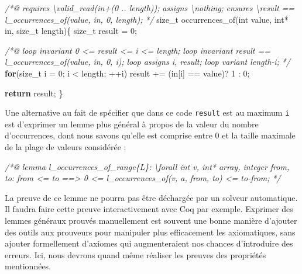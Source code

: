 \documentclass[12pt,francais,]{scrbook}
\newenvironment{Shaded}{}{}
\newcommand{\KeywordTok}[1]{\textcolor[rgb]{0.00,0.44,0.13}{\textbf{{#1}}}}
\newcommand{\DataTypeTok}[1]{\textcolor[rgb]{0.56,0.13,0.00}{{#1}}}
\newcommand{\DecValTok}[1]{\textcolor[rgb]{0.25,0.63,0.44}{{#1}}}
\newcommand{\CommentTok}[1]{\textcolor[rgb]{0.38,0.63,0.69}{\textit{{#1}}}}
\newcommand{\NormalTok}[1]{{#1}}
\begin{document}
\begin{footnotesize}\begin{Shaded}
\begin{Highlighting}[]
\CommentTok{/*@}
\CommentTok{  requires \textbackslash{}valid_read(in+(0 .. length));}
\CommentTok{  assigns  \textbackslash{}nothing;}
\CommentTok{  ensures  \textbackslash{}result == l_occurrences_of(value, in, 0, length);}
\CommentTok{*/}
\NormalTok{size_t occurrences_of(}\DataTypeTok{int} \NormalTok{value, }\DataTypeTok{int}\NormalTok{* in, size_t length)\{}
  \NormalTok{size_t result = }\DecValTok{0}\NormalTok{;}
  
  \CommentTok{/*@}
\CommentTok{    loop invariant 0 <= result <= i <= length;}
\CommentTok{    loop invariant result == l_occurrences_of(value, in, 0, i);}
\CommentTok{    loop assigns i, result;}
\CommentTok{    loop variant length-i;}
\CommentTok{  */}
  \KeywordTok{for}\NormalTok{(size_t i = }\DecValTok{0}\NormalTok{; i < length; ++i)}
    \NormalTok{result += (in[i] == value)? }\DecValTok{1} \NormalTok{: }\DecValTok{0}\NormalTok{;}

  \KeywordTok{return} \NormalTok{result;}
\NormalTok{\}}
\end{Highlighting}
\end{Shaded}\end{footnotesize}

Une alternative au fait de spécifier que dans ce code \texttt{result}
est au maximum \texttt{i} est d'exprimer un lemme plus général à propos
de la valeur du nombre d'occurrences, dont nous savons qu'elle est
comprise entre 0 et la taille maximale de la plage de valeurs considérée
:

\begin{footnotesize}\begin{Shaded}
\begin{Highlighting}[]
\CommentTok{/*@}
\CommentTok{lemma l_occurrences_of_range\{L\}:}
\CommentTok{  \textbackslash{}forall int v, int* array, integer from, to:}
\CommentTok{    from <= to ==> 0 <= l_occurrences_of(v, a, from, to) <= to-from;}
\CommentTok{*/}
\end{Highlighting}
\end{Shaded}\end{footnotesize}

La preuve de ce lemme ne pourra pas être déchargée par un solveur
automatique. Il faudra faire cette preuve interactivement avec Coq par
exemple. Exprimer des lemmes généraux prouvés manuellement est souvent
une bonne manière d'ajouter des outils aux prouveurs pour manipuler plus
efficacement les axiomatiques, sans ajouter formellement d'axiomes qui
augmenteraient nos chances d'introduire des erreurs. Ici, nous devrons
quand même réaliser les preuves des propriétés mentionnées.
\end{document}

